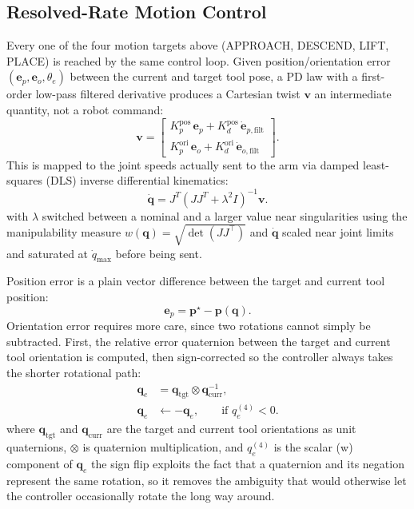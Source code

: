 \documentclass[letterpaper, 10 pt, conference]{ieeeconf}  %
\begin{document}
\subsection{Resolved-Rate Motion Control}
Every one of the four motion targets above (APPROACH, DESCEND, LIFT, PLACE) is
reached by the same control loop. Given position/orientation error
$(\mathbf e_p, \mathbf e_o, \theta_e)$ between the current and target tool pose, a PD
law with a first-order low-pass filtered derivative produces a Cartesian twist $\mathbf v$ an intermediate quantity, not a robot command:
\begin{equation}
\mathbf{v}
=
\begin{bmatrix}
K_{p}^{\mathrm{pos}}\,\mathbf{e}_{p}
+
K_{d}^{\mathrm{pos}}\,\dot{\mathbf{e}}_{p,\mathrm{filt}}
\\[1ex]
K_{p}^{\mathrm{ori}}\,\mathbf{e}_{o}
+
K_{d}^{\mathrm{ori}}\,\dot{\mathbf{e}}_{o,\mathrm{filt}}
\end{bmatrix}.
\end{equation}
This is mapped to the joint speeds actually sent to the arm via damped least-squares
(DLS) inverse differential kinematics:
\begin{equation}
\dot{\mathbf{q}}
=
J^{T}
\left(
JJ^{T}
+
\lambda^{2}I
\right)^{-1}
\mathbf{v}.
\end{equation}
with $\lambda$ switched between a nominal and a larger value near singularities using the manipulability measure $w(\mathbf q)=\sqrt{\det(JJ^\top)}$ and $\dot{\mathbf q}$ scaled near joint limits and saturated at $\dot q_{\max}$ before being sent.

Position error is a plain vector difference between the target and current tool position:
\begin{equation}
\mathbf{e}_{p}
=
\mathbf{p}^{\star}
-
\mathbf{p}(\mathbf{q}).
\label{position_e}
\end{equation}
Orientation error requires more care, since two rotations cannot simply be subtracted. First, the relative error quaternion between the target and current tool orientation is computed, then sign-corrected so the controller always takes the shorter rotational path:
\begin{equation}
\begin{aligned}
\mathbf{q}_{e}
&=
\mathbf{q}_{\mathrm{tgt}}
\otimes
\mathbf{q}_{\mathrm{curr}}^{-1}, \\
\mathbf{q}_{e}
&\leftarrow
-\mathbf{q}_{e},
\qquad
\text{if } q_{e}^{(4)} < 0.
\end{aligned}
\end{equation}
where $\mathbf q_{\text{tgt}}$  and $\mathbf q_{\text{curr}}$ are the target and current tool orientations as unit quaternions, $\otimes$ is quaternion multiplication, and $q_e^{(4)}$ is the scalar (w) component of $\mathbf q_e$ the sign flip exploits the
fact that a quaternion and its negation represent the same rotation, so it removes the ambiguity that would otherwise let the controller occasionally rotate the long way around.
\end{document}
